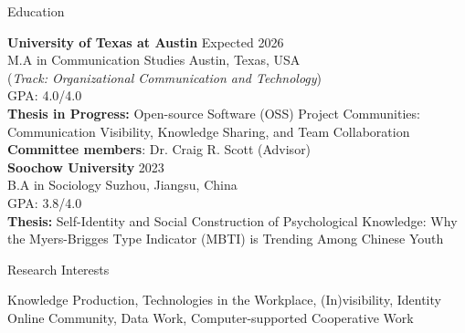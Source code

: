 \documentclass[
	11pt, %
]{resume} %
\begin{document}

\begin{rSection}{Education}
	
	\textbf{University of Texas at Austin} \hfill Expected 2026\\
	M.A in Communication Studies \hfill Austin, Texas, USA \\
	(\textit{Track: Organizational Communication and Technology}) \smallskip \\
	GPA: 4.0/4.0\\
    \textbf{Thesis in Progress:} Open-source Software (OSS) Project Communities: Communication Visibility, Knowledge Sharing, and Team Collaboration\\
    \textbf{Committee members}: Dr. Craig R. Scott (Advisor)\\

    \textbf{Soochow University} \hfill 2023 \\ 
	B.A in Sociology \hfill Suzhou, Jiangsu, China \\
	GPA: 3.8/4.0\\
    \textbf{Thesis:} Self-Identity and Social Construction of Psychological Knowledge: Why the Myers-Brigges Type Indicator (MBTI) is Trending Among Chinese Youth\\
	
\end{rSection}

\begin{rSection}{Research Interests}

Knowledge Production, Technologies in the Workplace, (In)visibility, Identity\\
Online Community, Data Work, Computer-supported Cooperative Work\\

\end{rSection}

\end{document}
